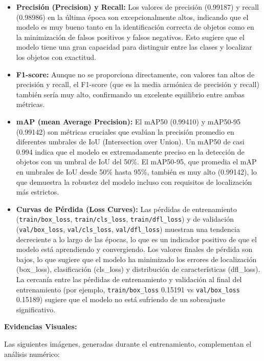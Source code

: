 \documentclass{article}
\begin{document}
\begin{itemize}
    \item \textbf{Precisión (Precision) y Recall:} Los valores de precisión (0.99187) y recall (0.98986) en la última época son excepcionalmente altos, indicando que el modelo es muy bueno tanto en la identificación correcta de objetos como en la minimización de falsos positivos y falsos negativos. Esto sugiere que el modelo tiene una gran capacidad para distinguir entre las clases y localizar los objetos con exactitud.

    \item \textbf{F1-score:} Aunque no se proporciona directamente, con valores tan altos de precisión y recall, el F1-score (que es la media armónica de precisión y recall) también sería muy alto, confirmando un excelente equilibrio entre ambas métricas.

    \item \textbf{mAP (mean Average Precision):} El mAP50 (0.99410) y mAP50-95 (0.99142) son métricas cruciales que evalúan la precisión promedio en diferentes umbrales de IoU (Intersection over Union). Un mAP50 de casi 0.994 indica que el modelo es extremadamente preciso en la detección de objetos con un umbral de IoU del 50\%. El mAP50-95, que promedia el mAP en umbrales de IoU desde 50\% hasta 95\%, también es muy alto (0.99142), lo que demuestra la robustez del modelo incluso con requisitos de localización más estrictos.

    \item \textbf{Curvas de Pérdida (Loss Curves):} Las pérdidas de entrenamiento (\texttt{train/box\_loss}, \texttt{train/cls\_loss}, \texttt{train/dfl\_loss}) y de validación (\texttt{val/box\_loss}, \texttt{val/cls\_loss}, \texttt{val/dfl\_loss}) muestran una tendencia decreciente a lo largo de las épocas, lo que es un indicador positivo de que el modelo está aprendiendo y convergiendo. Los valores finales de pérdida son bajos, lo que sugiere que el modelo ha minimizado los errores de localización (box\_loss), clasificación (cls\_loss) y distribución de características (dfl\_loss). La cercanía entre las pérdidas de entrenamiento y validación al final del entrenamiento (por ejemplo, \texttt{train/box\_loss} 0.15191 vs \texttt{val/box\_loss} 0.15189) sugiere que el modelo no está sufriendo de un sobreajuste significativo.
\end{itemize}

\textbf{Evidencias Visuales:}

Las siguientes imágenes, generadas durante el entrenamiento, complementan el análisis numérico:
\end{document}
